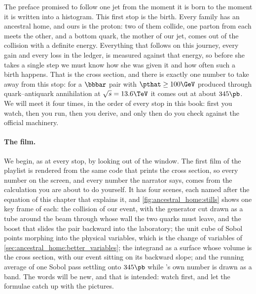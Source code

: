 The preface promised to follow one jet from the moment it is born to the
moment it is written into a histogram. This first stop is the birth. Every
family has an ancestral home, and ours is the proton: two of them collide,
one parton from each meets the other, and a bottom quark, the mother of our
jet, comes out of the collision with a definite energy. Everything that
follows on this journey, every gain and every loss in the ledger, is
measured against that energy, so before she takes a single step we must know
how she was given it and how often such a birth happens. That is the
cross section, and there is exactly one number to take away from this
stop: for a $\bbbar$ pair with $\pthat\ge100\GeV$ produced through
quark--antiquark annihilation at $\sqrt{s}=13.6\TeV$ it comes out at about
$345\pb$. We will meet it four times, in the order of every stop in this
book: first you watch, then you run, then you derive, and only then do you
check against the official machinery.

\paragraph{The film.}
\label{sec:ancestral_home:animation}
We begin, as at every stop, by looking out of the window. The first film of
the \jitjetworld playlist is rendered from the same code that prints the
cross section, so every number on the screen, and every number the narrator
says, comes from the calculation you are about to do yourself. It has four
scenes, each named after the equation of this chapter that explains it, and
\cref{fig:ancestral_home:stills} shows one key frame of each: the collision
of our event, with the generator cut drawn as a tube around the beam through
whose wall the two quarks must leave, and the boost that slides the pair
backward into the laboratory; the unit cube of Sobol points morphing into the
physical variables, which is the change of variables of
\cref{sec:ancestral_home:better_variables}; the integrand as a surface whose
volume is the cross section, with our event sitting on its backward slope;
and the running average of one Sobol pass settling onto $345\pb$ while
\PYTHIA's own number is drawn as a band. The words will be new, and that is
intended: watch first, and let the formulae catch up with the pictures.

